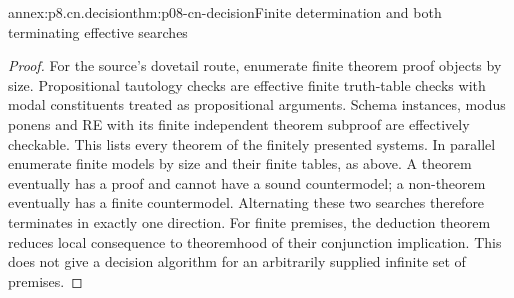 \begin{annexitem}{annex:p8.cn.decision}{thm:p08-cn-decision}{Finite determination and both terminating effective searches}
\begin{proof}
For the source's dovetail route, enumerate finite theorem proof
objects by size. Propositional tautology checks are effective
finite truth-table checks with modal constituents treated as
propositional arguments. Schema instances, modus ponens and
RE with its finite independent theorem subproof are effectively
checkable. This lists every theorem of the finitely presented
systems. In parallel enumerate finite models by size and their
finite tables, as above. A theorem eventually has a proof and
cannot have a sound countermodel; a non-theorem eventually has
a finite countermodel. Alternating these two searches therefore
terminates in exactly one direction. For finite premises, the
deduction theorem reduces local consequence to theoremhood of
their conjunction implication. This does not give a decision
algorithm for an arbitrarily supplied infinite set of premises.
\end{proof}
\end{annexitem}


